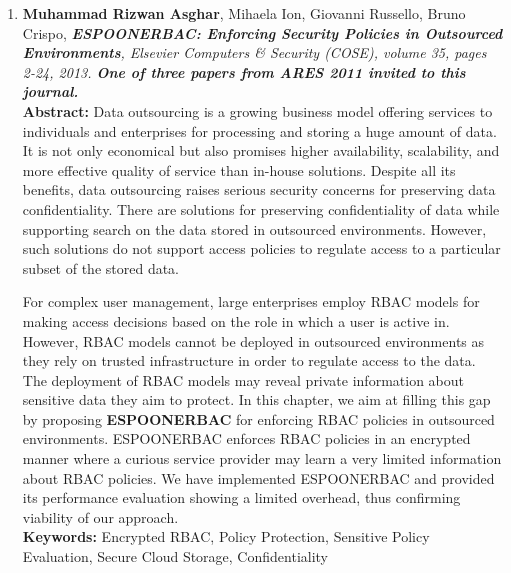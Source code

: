 \documentclass[epsfig,a4paper,11pt,titlepage]{book}
\numberwithin{algorithm}{chapter}
\begin{document}
\begin{enumerate}

  \item \textbf{Muhammad Rizwan Asghar}, Mihaela Ion, Giovanni Russello, Bruno Crispo, \textit{\textbf{\gls{ESPOONERBAC}: Enforcing Security Policies in Outsourced Environments}, Elsevier Computers \& Security (COSE), volume 35, pages 2-24, 2013. \textbf{One of three papers from ARES 2011 invited to this journal.}} \vspace{3mm} \\
\textbf{Abstract:} Data outsourcing is a growing business model offering services to individuals and enterprises for processing and storing a huge amount of data. It is not only economical but also promises higher availability, scalability, and more effective quality of service than in-house solutions. Despite all its benefits, data outsourcing raises serious security concerns for preserving data confidentiality. There are solutions for preserving confidentiality of data while supporting search on the data stored in outsourced environments. However, such solutions do not support access policies to regulate access to a particular subset of the stored data. 

	For complex user management, large enterprises employ \acrfull{RBAC} models for making access decisions based on the role in which a user is active in. However, \gls{RBAC} models cannot be deployed in outsourced environments as they rely on trusted infrastructure in order to regulate access to the data. The deployment of \gls{RBAC} models may reveal private information about sensitive data they aim to protect. In this chapter, we aim at filling this gap by proposing \textbf{\gls{ESPOONERBAC}} for enforcing \gls{RBAC} policies in outsourced environments. \gls{ESPOONERBAC} enforces \gls{RBAC} policies in an encrypted manner where a curious service provider may learn a very limited information about \gls{RBAC} policies. We have implemented \gls{ESPOONERBAC} and provided its performance evaluation showing a limited overhead, thus confirming viability of our approach. \vspace{3mm} \\
\textbf{Keywords:} Encrypted \gls{RBAC}, Policy Protection, Sensitive Policy Evaluation, Secure Cloud Storage, Confidentiality
  

\end{enumerate}
\end{document}
